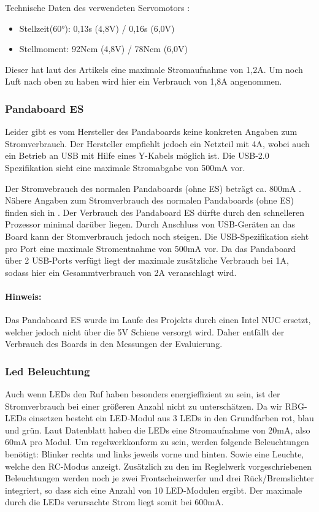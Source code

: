 Technische Daten des verwendeten Servomotors \cite{website-servo-dat}:
\begin{itemize}
 \item Stellzeit(60°): 0,13s (4,8V) / 0,16s (6,0V)
 \item Stellmoment: 92Ncm (4,8V) / 78Ncm (6,0V)
\end{itemize}



Dieser hat laut des Artikels eine maximale Stromaufnahme von 1,2A. Um noch Luft nach oben zu haben wird hier ein Verbrauch von 
1,8A angenommen.

\subsubsection{Pandaboard ES}
Leider gibt es vom Hersteller des Pandaboards keine konkreten Angaben zum Stromverbrauch. Der Hersteller empfiehlt jedoch ein
Netzteil mit 4A\cite{website-panda-supply}, wobei auch ein Betrieb an USB mit Hilfe eines Y-Kabels möglich ist. Die USB-2.0 Spezifikation\cite{website-usb-spec} sieht eine maximale 
Stromabgabe von 500mA vor.

Der Stromvebrauch des normalen Pandaboards (ohne ES) beträgt ca. 800mA \cite{website-panda-power}.
Nähere Angaben zum Stromverbrauch des normalen Pandaboards (ohne ES) finden sich in \cite{website-panda-power}.
Der Verbrauch des Pandaboard ES dürfte durch den schnelleren Prozessor minimal darüber liegen. 
Durch Anschluss von USB-Geräten an das Board kann der Stomverbrauch jedoch noch steigen. Die USB-Spezifikation \cite{website-usb-spec}
sieht pro Port eine maximale Stromentnahme von 500mA vor. Da das Pandaboard über 2 USB-Ports verfügt liegt der maximale zusätzliche Verbrauch bei 1A,
sodass hier ein Gesammtverbrauch von 2A veranschlagt wird.

\paragraph{Hinweis:}
Das Pandaboard ES wurde im Laufe des Projekts durch einen Intel NUC ersetzt, welcher jedoch nicht über die 5V Schiene versorgt wird.
Daher entfällt der Verbrauch des Boards in den Messungen der Evaluierung.

\subsubsection{Led Beleuchtung}
Auch wenn LEDs den Ruf haben besonders energieffizient zu sein, ist der Stromverbrauch bei einer größeren Anzahl nicht zu
unterschätzen. Da wir RBG-LEDs einsetzen besteht ein LED-Modul aus 3 LEDs in den Grundfarben rot, blau und grün.
Laut Datenblatt \cite{ds-WS2812} haben die LEDs eine Stromaufnahme von 20mA, also 60mA pro Modul.
Um regelwerkkonform zu sein, werden folgende Beleuchtungen benötigt: Blinker rechts und links jeweils vorne und hinten.
Sowie eine Leuchte, welche den RC-Modus anzeigt. Zusätzlich zu den im Reglelwerk vorgeschriebenen Beleuchtungen werden noch je
zwei Frontscheinwerfer und drei Rück/Bremslichter integriert, so dass sich eine Anzahl von 10 LED-Modulen ergibt.
Der maximale durch die LEDs verursachte Strom liegt somit bei 600mA. 

